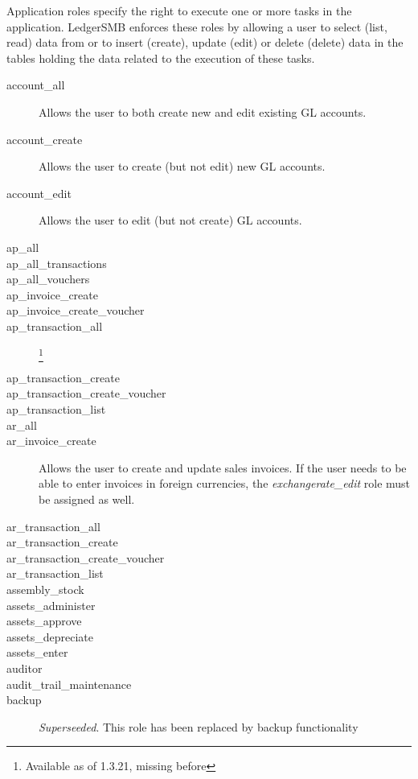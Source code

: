 Application roles specify the right to execute one or more tasks in the application.
LedgerSMB enforces these roles by allowing a user to select (list, read) data from or to
insert (create), update (edit) or delete (delete) data in the tables holding the data
related to the execution of these tasks.

\begin{description}
\item [account\_all] Allows the user to both create new and edit existing GL accounts.
\item [account\_create] Allows the user to create (but not edit) new GL accounts.
\item [account\_edit] Allows the user to edit (but not create) GL accounts.
\item [ap\_all]
\item [ap\_all\_transactions]
\item [ap\_all\_vouchers]
\item [ap\_invoice\_create]
\item [ap\_invoice\_create\_voucher]
\item [ap\_transaction\_all] \footnote{Available as of 1.3.21, missing before}
\item [ap\_transaction\_create]
\item [ap\_transaction\_create\_voucher]
\item [ap\_transaction\_list]
\item [ar\_all]
\item [ar\_invoice\_create] Allows the user to create and update sales invoices. If the
   user needs to be able to enter invoices in foreign currencies, the
   \emph{exchangerate\_edit} role must be assigned as well.
\item [ar\_transaction\_all]
\item [ar\_transaction\_create]
\item [ar\_transaction\_create\_voucher]
\item [ar\_transaction\_list]
\item [assembly\_stock]
\item [assets\_administer]
\item [assets\_approve]
\item [assets\_depreciate]
\item [assets\_enter]
\item [auditor]
\item [audit\_trail\_maintenance]
\item [backup] \emph{Superseeded}. This role has been replaced by backup functionality

\end{description}
